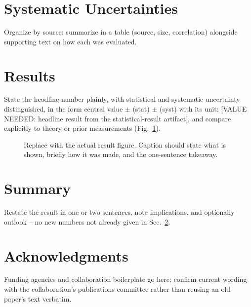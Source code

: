 \documentclass[11pt]{article}
\begin{document}
\section{Systematic Uncertainties}
\label{sec:systematics}

Organize by source; summarize in a table (source, size, correlation)
alongside supporting text on how each was evaluated.

\section{Results}
\label{sec:results}

State the headline number plainly, with statistical and systematic
uncertainty distinguished, in the form central value $\pm$ (stat) $\pm$
(syst) with its unit:
[VALUE NEEDED: headline result from the statistical-result artifact],
and compare explicitly to theory or prior measurements
(Fig.~\ref{fig:result}).

\begin{figure}[htbp]
  \centering
  \caption{Replace with the actual result figure. Caption should state what
    is shown, briefly how it was made, and the one-sentence takeaway.}
  \label{fig:result}
\end{figure}

\section{Summary}
\label{sec:summary}

Restate the result in one or two sentences, note implications, and
optionally outlook -- no new numbers not already given in
Sec.~\ref{sec:results}.

\section*{Acknowledgments}

Funding agencies and collaboration boilerplate go here; confirm current
wording with the collaboration's publications committee rather than reusing
an old paper's text verbatim.



\end{document}
